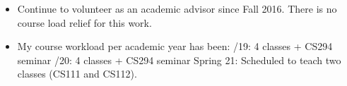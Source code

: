 \documentclass[11pt]{article}
\begin{document}
\begin{itemize}
  \item Continue to volunteer as an academic advisor since Fall
    2016. There is no course load relief for this work.

  \item My course workload per academic year has been:
    /19: 4 classes + CS294 seminar
    /20: 4 classes + CS294 seminar
    \subitem Spring 21: Scheduled to teach two classes (CS111 and CS112).
  
\end{itemize}
\end{document}
